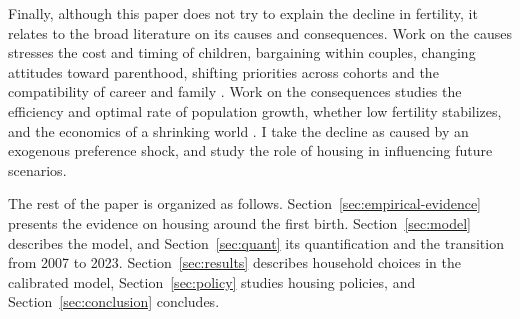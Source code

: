Finally, although this paper does not try to explain the decline in
fertility, it relates to the broad literature on its causes and
consequences. Work on the causes stresses the cost and timing of children,
bargaining within couples, changing attitudes toward parenthood, shifting priorities across cohorts and the compatibility of
career and family
\citep{jonesSchoonbroodtTertilt2010,doepkeBargainingBabiesTheory2019,kearneyPuzzleFallingUS2022,doepkeEconomicsFertilityNew2023,kimStatusExternalitiesEducation2024,kearneyLevineWhyFertilityLow2025,fernandezBerniellOnofri2026}.
Work on the consequences studies the efficiency and optimal rate of
population growth, whether low fertility stabilizes, and the economics of a
shrinking world
\citep{golosovjonestertilt2007,ballOptimalPopulation2026,coffeyGerusoSpearsVyas2026,fernandezVillaverdeNorrickTerraIncognita2026}.
I take the decline as caused by an exogenous preference shock, and study the role of housing in influencing future scenarios.

The rest of the paper is organized as follows.
Section~\ref{sec:empirical-evidence} presents the evidence on housing around
the first birth. Section~\ref{sec:model} describes the model, and
Section~\ref{sec:quant} its quantification and the transition from 2007 to
2023. Section~\ref{sec:results} describes household choices in the calibrated
model, Section~\ref{sec:policy} studies housing policies, and
Section~\ref{sec:conclusion} concludes.
